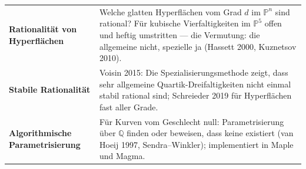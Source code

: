 \begin{forschung}
\begin{center}
{\small
\renewcommand{\arraystretch}{1.45}
\begin{tabular}{@{}P{3.0cm}P{5.2cm}@{}}
\toprule
\textbf{Rationalität von Hyperflächen} & Welche glatten Hyperflächen vom Grad $d$ im $\mathbb P^{n}$ sind rational? Für kubische Vierfaltigkeiten im $\mathbb P^{5}$ offen und heftig umstritten --- die Vermutung: die allgemeine nicht, spezielle ja (Hassett 2000, Kuznetsov 2010).\\
\textbf{Stabile Rationalität} & Voisin 2015: Die Spezialisierungsmethode zeigt, dass sehr allgemeine Quartik-Dreifaltigkeiten nicht einmal stabil rational sind; Schreieder 2019 für Hyperflächen fast aller Grade.\\
\textbf{Algorithmische Parametrisierung} & Für Kurven vom Geschlecht null: Parametrisierung über $\mathbb Q$ finden oder beweisen, dass keine existiert (van Hoeij 1997, Sendra--Winkler); implementiert in Maple und Magma.\\
\bottomrule
\end{tabular}}
\end{center}

\begin{center}
\begin{minipage}{0.88\textwidth}
\end{minipage}
\end{center}
\end{forschung}

